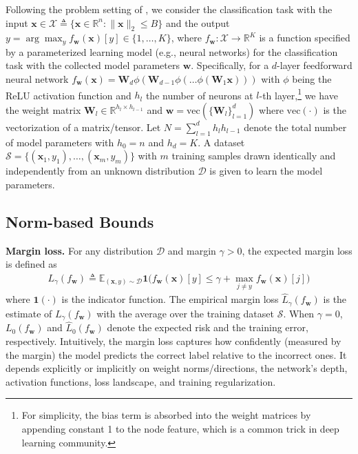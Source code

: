 \documentclass[journal]{IEEEtran} %
\def\vone{{\bm{1}}}
\def\vw{{\bm{w}}}
\def\vx{{\bm{x}}}
\def\mW{{\bm{W}}}
\newcommand{\R}{\mathbb{R}}
\begin{document}
Following the problem setting of \cite{neyshabur2018pac}, we consider the classification task with the input $\vx \in \mathcal{X} \triangleq \{\vx \in \mathbb{R}^n: \|\vx\|_2 \le B\}$ and the output $y = \arg \max_y f_{\vw}(\vx)[y]\in \{1,\dots,K\} $, where $f_{\vw}: \mathcal{X} \to \mathbb{R}^K$ is a function specified by a parameterized learning model (e.g., neural networks) for the classification task with the collected model parameters $\vw$. Specifically, for a $d$-layer feedforward neural network $f_{\vw}(\vx)=\mW_d \phi(\mW_{d-1}\phi(\dots \phi(\mW_1 \vx)))$ with $\phi$ being the ReLU activation function and $h_l$ the number of neurons at $l$-th layer,\footnote{For simplicity, the bias term is absorbed into the weight matrices by appending constant 1 to the node feature, which is a common trick in deep learning community.} we have the weight matrix $\mW_l \in \R^{h_{l} \times h_{l-1}}$ and $\vw=\mathrm{vec}(\{\mW_l\}_{l=1}^d)$ where $\mathrm{vec}(\cdot)$ is the vectorization of a matrix/tensor. 
Let $N=\sum_{l=1}^d h_l h_{l-1}$ denote the total number of model parameters with $h_0=n$ and $h_d=K$.
A dataset $\mathcal{S}=\{(\vx_1,y_1), \dots, (\vx_m,y_m)\}$ with $m$ training samples drawn identically and independently from an unknown distribution $\mathcal{D}$ is given to learn the model parameters.
\subsection{Norm-based Bounds}
\textbf{Margin loss.} For any distribution $\mathcal{D}$ and margin $\gamma>0$, the expected margin loss is defined as
\begin{align}
    L_{\gamma}(f_{\vw}) \triangleq \mathbb{E}_{(\vx,y) \sim \mathcal{D}} \vone\Big( f_{\vw}(\vx)[y] \le \gamma + \max_{j \neq y} f_{\vw}(\vx)[j] \Big)
\end{align}
where $\vone(\cdot)$ is the indicator function. The empirical margin loss $\hat{L}_{\gamma}(f_{\vw})$ is the estimate of $L_{\gamma}(f_{\vw})$ with the average over the training dataset $\mathcal{S}$. When $\gamma=0$, $L_{0}(f_{\vw})$ and $\hat{L}_{0}(f_{\vw})$ denote the expected risk and the training error, respectively.
Intuitively, the margin loss captures how confidently (measured by the margin) the model predicts the correct label relative to the incorrect ones. It depends explicitly or implicitly on weight norms/directions, the network's depth, activation functions, loss landscape, and training regularization.
\end{document}
